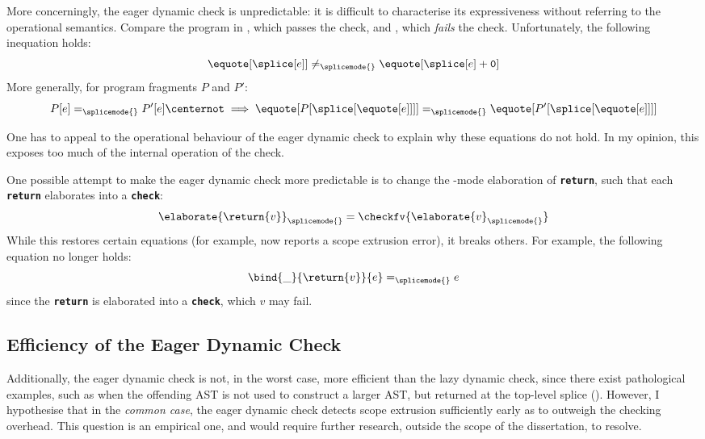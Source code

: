 More concerningly, the eager dynamic check is unpredictable: it is difficult to characterise its expressiveness without referring to the operational semantics. Compare the program in , which passes the check, and , which \textit{fails} the check. Unfortunately, the following inequation holds:
\[\equote[\splice[e]] \neq_{\splicemode{}} \equote[{\splice[e] + \texttt{0}}]\]
More generally, for program fragments $P$ and $P'$:
\[P[e] =_{\splicemode{}} P'[e] \centernot\implies \equote[{P[\splice[{\equote[e]}]]}] =_{\splicemode{}} \equote[{P'[\splice[{\equote[e]}]]}]\]

One has to appeal to the operational behaviour of the eager dynamic check to explain why these equations do not hold. In my opinion, this exposes too much of the internal operation of the check. 

One possible attempt to make the eager dynamic check more predictable is to change the \splicemode{}-mode elaboration of \textbf{\texttt{return}}, such that each \textbf{\texttt{return}} elaborates into a \textbf{\texttt{check}}:
\[\elaborate{\return{v}}_{\splicemode{}} = \checkfv{\elaborate{v}_{\splicemode{}}}\]
While this restores certain equations (for example,  now reports a scope extrusion error), it breaks others. For example, the following equation \citep{levy-2003} no longer holds:
\[\bind{\_}{\return{v}}{e} =_{\splicemode{}} e\]
since the \textbf{\texttt{return}} is elaborated into a \textbf{\texttt{check}}, which $v$ may fail.

\subsection{Efficiency of the Eager Dynamic Check}\label{subsection:eager-dynamic-efficiency}
Additionally, the eager dynamic check is not, in the worst case, more efficient than the lazy dynamic check, since there exist pathological examples, such as when the offending AST is not used to construct a larger AST, but returned at the top-level splice (). However, I hypothesise that in the \textit{common case}, the eager dynamic check detects scope extrusion sufficiently early as to outweigh the checking overhead. This question is an empirical one, and would require further research, outside the scope of the dissertation, to resolve. 

